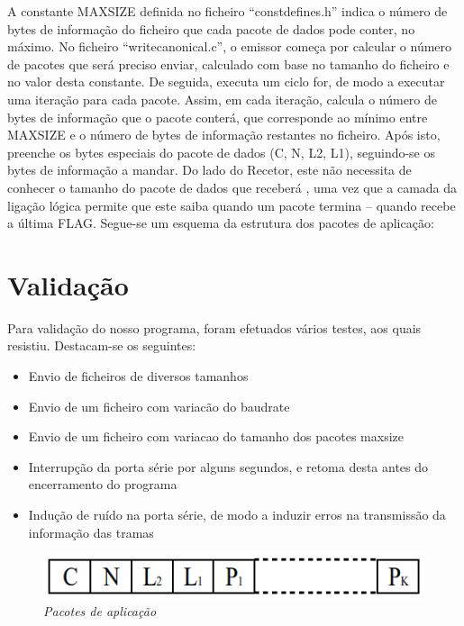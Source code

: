 \documentclass[article, a4paper, 11pt, oneside]{memoir}
\begin{document}
A constante MAX\textunderscore SIZE definida no ficheiro “constdefines.h” indica o número de bytes de informação do
ficheiro que cada pacote de dados pode conter, no máximo.
No ficheiro “writecanonical.c”, o emissor começa por calcular o número de pacotes que será preciso enviar, 
calculado com base no tamanho do ficheiro e no valor desta constante. De seguida, executa um ciclo for, de modo 
a executar uma iteração para cada pacote. 
Assim, em cada iteração, calcula o número de bytes de informação que o pacote conterá, que corresponde ao 
mínimo entre MAX\textunderscore SIZE e o número de bytes de informação 
restantes no ficheiro. Após isto, preenche os bytes especiais do pacote de dados (C, N, L2, L1), seguindo-se 
os bytes de informação a mandar. Do lado do Recetor, 
este não necessita de conhecer o tamanho do pacote de dados que receberá , uma vez que a camada da ligação 
lógica permite que este saiba quando um pacote termina – quando recebe a última FLAG. Segue-se um esquema 
da estrutura dos pacotes de aplicação:


\chapter[Validação][Validação]{Validação} \label{\thechapter}

Para validação do nosso programa, foram efetuados vários testes, aos quais resistiu. Destacam-se os seguintes:

\begin{itemize}
	\item Envio de ficheiros de diversos tamanhos
	\item Envio de um ficheiro com variacão do baudrate
	\item Envio de um ficheiro com variacao do tamanho dos pacotes max\textunderscore size
	\item Interrupção da porta série por alguns segundos, e retoma desta antes do encerramento do programa
	\item Indução de ruído na porta série, de modo a induzir erros na transmissão da informação das tramas
\end{itemize}

\begin{figure}[h]
	\centering
\includegraphics[scale=0.4]{trama-1.png}
\caption{\emph{Pacotes de aplicação}}
\end{figure}
\end{document}
